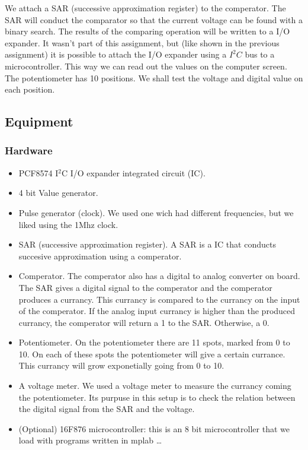 \documentclass[a4paper, 12pt, titlepage]{article}
\begin{document}
We attach a SAR (successi­ve approxima­ti­on register) to the comperator. The SAR will conduct the comparator so that the current voltage can be found with a binary search. The results of the comparing operation will be written to a I/O expander. It wasn't part of this assignment, but (like shown in the previous assignment) it is possible to attach the I/O expander using a $I^{2}C$ bus to a microcontroller. This way we can read out the values on the computer screen. The potentiometer has 10 positions. We shall test the voltage and digital value on each position.


\subsection{Equipment} %
\subsubsection{Hardware}

\begin{itemize}
\item PCF8574 I$^2$C I/O expander integrated circuit (IC).
\item 4 bit Value generator. 
\item Pulse generator (clock). We used one wich had different frequencies, but we liked using the 1Mhz clock.
\item SAR (successi­ve approxima­ti­on register). A SAR is a IC that conducts succesive approximation using a comperator.
\item Comperator. The comperator also has a digital to analog converter on board. The SAR gives a digital signal to the comperator and the comperator produces a currancy. This currancy is compared to the currancy on the input of the comperator. If the analog input currancy is higher than the produced currancy, the comperator will return a 1 to the SAR. Otherwise, a 0.
\item Potentiometer. On the potentiometer there are 11 spots, marked from 0 to 10. On each of these spots the potentiometer will give a certain currance. This currancy will grow exponetially going from 0 to 10. 
\item A voltage meter. We used a voltage meter to measure the currancy coming the potentiometer. Its purpuse in this setup is to check the relation between the digital signal from the SAR and the voltage.
\item (Optional) 16F876 microcontroller: this is an 8 bit microcontroller that we load with
programs written in mplab \dots
\end{itemize}
\end{document}
